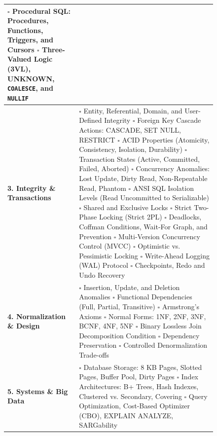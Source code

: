 \begin{figure}[htbp]
\begin{tabularx}{\textwidth}{l X}
$\square$ Procedural SQL: Procedures, Functions, Triggers, and Cursors \newline
$\square$ Three-Valued Logic (3VL), UNKNOWN, \texttt{COALESCE}, and \texttt{NULLIF} \\
\midrule
\textbf{3. Integrity \& Transactions} & $\square$ Entity, Referential, Domain, and User-Defined Integrity \newline
$\square$ Foreign Key Cascade Actions: CASCADE, SET NULL, RESTRICT \newline
$\square$ ACID Properties (Atomicity, Consistency, Isolation, Durability) \newline
$\square$ Transaction States (Active, Committed, Failed, Aborted) \newline
$\square$ Concurrency Anomalies: Lost Update, Dirty Read, Non-Repeatable Read, Phantom \newline
$\square$ ANSI SQL Isolation Levels (Read Uncommitted to Serializable) \newline
$\square$ Shared and Exclusive Locks \quad $\square$ Strict Two-Phase Locking (Strict 2PL) \newline
$\square$ Deadlocks, Coffman Conditions, Wait-For Graph, and Prevention \newline
$\square$ Multi-Version Concurrency Control (MVCC) \quad $\square$ Optimistic vs. Pessimistic Locking \newline
$\square$ Write-Ahead Logging (WAL) Protocol \quad $\square$ Checkpoints, Redo and Undo Recovery \\
\midrule
\textbf{4. Normalization \& Design} & $\square$ Insertion, Update, and Deletion Anomalies \newline
$\square$ Functional Dependencies (Full, Partial, Transitive) \quad $\square$ Armstrong's Axioms \newline
$\square$ Normal Forms: 1NF, 2NF, 3NF, BCNF, 4NF, 5NF \newline
$\square$ Binary Lossless Join Decomposition Condition \quad $\square$ Dependency Preservation \newline
$\square$ Controlled Denormalization Trade-offs \\
\midrule
\textbf{5. Systems \& Big Data} & $\square$ Database Storage: 8 KB Pages, Slotted Pages, Buffer Pool, Dirty Pages \newline
$\square$ Index Architectures: B+ Trees, Hash Indexes, Clustered vs. Secondary, Covering \newline
$\square$ Query Optimization, Cost-Based Optimizer (CBO), EXPLAIN ANALYZE, SARGability \newline

\end{tabularx}
\end{figure}
